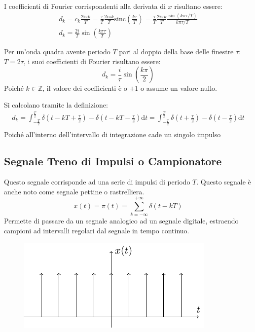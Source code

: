 \documentclass{article}
\newcommand{\sinc}{\mathrm{sinc}}
\newcommand{\df}{\mathrm{d}}
\numberwithin{equation}{subsection}
\begin{document}
I coefficienti di Fourier corrispondenti alla derivata di $x$ risultano essere:
\begin{gather*}
    d_k=c_k\displaystyle\frac{2i\pi k}{T}=\frac{\tau}{T}\frac{2i\pi k}{T}\sinc\left({\frac{k\tau}{T}}\right)=\frac{\tau}{T}\frac{2i\pi k}{T}\frac{\sin(k\pi \tau/T)}{k\pi \tau/T}\\
    d_k=\displaystyle\frac{2i}{T}\sin\left(\frac{k\pi\tau}{T}\right)
\end{gather*}

Per un'onda quadra avente periodo $T$ pari al doppio della base delle finestre $\tau$: $T=2\tau$, i suoi coefficienti di Fourier risultano essere:
\begin{equation*}
    d_k=\displaystyle\frac{i}{\tau}\sin\left(\frac{k\pi}{2}\right)
\end{equation*}
Poiché $k\in\mathbb{Z}$, il valore dei coefficienti è o $\pm1$ o assume un valore nullo. 

Si calcolano tramite la definizione:
\begin{gather*}
    d_k=\displaystyle\int_{-\frac{T}{2}}^{\frac{T}{2}}\delta\left(t-kT+\frac{\tau}{2}\right)-\delta\left(t-kT-\frac{\tau}{2}\right)\df t=
    \int_{-\frac{T}{2}}^{\frac{T}{2}}\delta\left(t+\frac{\tau}{2}\right)-\delta\left(t-\frac{\tau}{2}\right)\df t\\
\end{gather*}
Poiché all'interno dell'intervallo di integrazione cade un singolo impulso

\subsection{Segnale Treno di Impulsi o Campionatore}

Questo segnale corrisponde ad una serie di impulsi di periodo $T$. Questo segnale è anche noto come segnale pettine o rastrelliera.  
\begin{equation*}
    x(t)=\pi(t)=\displaystyle\sum_{k=-\infty}^{+\infty}\delta(t-kT)
\end{equation*}
Permette di passare da un segnale analogico ad un segnale digitale, estraendo campioni ad intervalli regolari dal segnale in tempo continuo. 

\begin{figure}[H]%
    \centering
    \includegraphics{rastrelliera.pdf}%
\end{figure}
\end{document}
